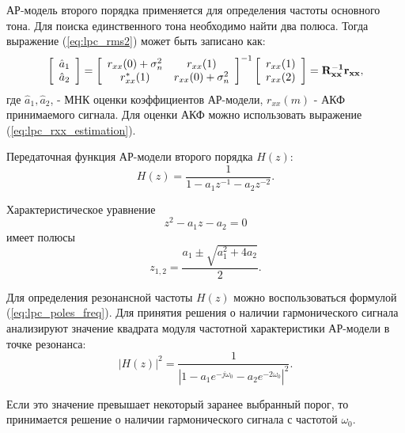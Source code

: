 АР-модель второго порядка применяется для определения частоты основного тона. Для поиска единственного
тона необходимо найти два полюса. Тогда выражение (\ref{eq:lpc_rms2}) может быть записано как:
\begin{equation}
	\label{eq:lpc_a_estimation}
	\left[ \begin{array}{c}
		\hat{a}_1 \\
		\hat{a}_2
	\end{array} \right]
	=
		\left[ \begin{array}{cc}
			r_{xx}(0)  + \sigma_n^2 & r_{xx}(1)\\
			r_{xx}^*(1) & r_{xx}(0) + \sigma_n^2 
		\end{array} \right]^{-1}
		\left[ \begin{array}{c}
			r_{xx}(1) \\
			r_{xx}(2)
		\end{array} \right]
	= \bf{R_{xx}^{-1}r_{xx}},
\end{equation}
где ${\hat{a}_1, \hat{a}_2}$, - МНК оценки коэффициентов АР-модели, ${r_{xx}(m)}$ - АКФ принимаемого сигнала.
Для оценки АКФ  можно использовать выражение (\ref{eq:lpc_rxx_estimation}).

Передаточная функция АР-модели второго порядка ${H(z)}$:
\begin{equation}
	\label{eq:lpc_spectral_func}
	H(z) = \frac{1}{1 - a_1 z^{-1} - a_2 z^{-2}}.
\end{equation}

Характеристическое уравнение
\begin{equation}
	\label{eq:lpc_characteristic}
	z^2 - a_1 z - a_2 = 0
\end{equation}
имеет полюсы
\begin{equation}
	\label{eq:lpc_poles_2}
	z_{1,2} =\frac{a_1 \pm \sqrt{a_1^2 + 4 a_2}}{2}.
\end{equation}

Для определения резонансной частоты ${H(z)}$ можно воспользоваться формулой (\ref{eq:lpc_poles_freq}).
Для принятия решения о наличии гармонического сигнала анализируют значение квадрата модуля частотной
характеристики АР-модели в точке резонанса:
\begin{equation}
	\label{eq:lpc_power_cos}
	\left| H(z) \right|^2 = \frac{1}{\left| 1 - a_1 e^{-j \omega_0} - a_2 e^{-2 \omega_0} \right|^2}.
\end{equation}

Если это значение превышает некоторый заранее выбранный порог, то принимается решение о наличии гармонического
сигнала с частотой ${\omega_0}$. 

